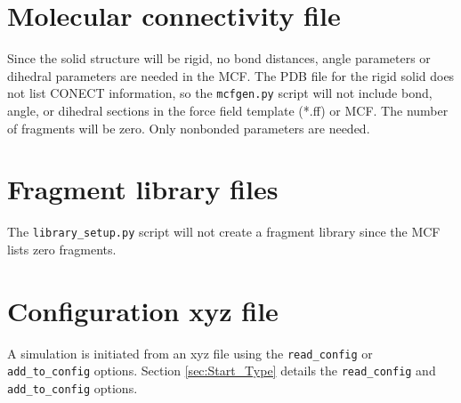 \section{Molecular connectivity file}\label{sec:solid_mcf}
Since the solid structure will be rigid, no bond distances, angle parameters or dihedral parameters are needed in the MCF.
The PDB file for the rigid solid does not list CONECT information, so the \texttt{mcfgen.py} script will not include bond, 
angle, or dihedral sections in the force field template (*.ff) or MCF. The number of fragments will be zero. 
Only nonbonded parameters are needed.

\section{Fragment library files}\label{sec:fragment file}
The \texttt{library\_setup.py} script will not create a fragment library since the MCF lists zero fragments.

\section{Configuration xyz file}\label{sec:solid_xyz}
A simulation is initiated from an xyz file using the \texttt{read\_config} or \texttt{add\_to\_config} options. 
Section \ref{sec:Start_Type} details the \texttt{read\_config} and \texttt{add\_to\_config} options.
